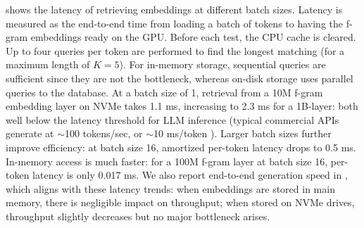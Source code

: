  shows the latency of retrieving embeddings at different batch sizes. Latency is measured as the end-to-end time from loading a batch of tokens to having the f-gram embeddings ready on the GPU.
Before each test, the CPU cache is cleared. Up to four queries per token are performed to find the longest matching  (for a maximum  length of $K=5$). For in-memory storage, sequential queries are sufficient since they are not the bottleneck, whereas on-disk storage uses parallel queries to the database.
At a batch size of 1, retrieval from a 10M f-gram embedding layer on NVMe takes 1.1 ms, increasing to 2.3 ms for a 1B-layer: both well below the latency threshold for LLM inference (typical commercial APIs generate at $\sim$100 tokens/sec, or $\sim$10 ms/token \citep{generation_speed}).
Larger batch sizes further improve efficiency: at batch size 16, amortized per-token latency drops to 0.5 ms. In-memory access is much faster: for a 100M f-gram layer at batch size 16, per-token latency is only 0.017 ms.
We also report end-to-end generation speed in , which aligns with these latency trends: when embeddings are stored in main memory, there is negligible impact on throughput; when stored on NVMe drives, throughput slightly decreases but no major bottleneck arises.

